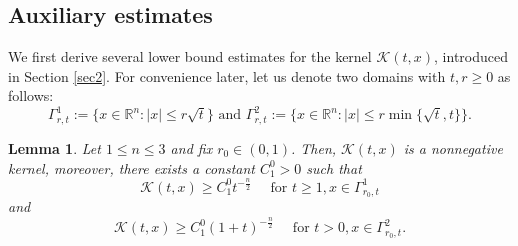 \documentclass[11pt,reqno]{amsart}
\newtheorem{lemma}{Lemma}[section]
\begin{document}
	\subsection{Auxiliary estimates}
	We first derive several lower bound estimates for the kernel $\mathcal{K}(t,x)$, introduced in Section \ref{sec2}. For convenience later, let us denote two domains with $t,r\ge 0$ as follows:
	$$\Gamma^1_{r,t}:= \{x\in\mathbb{R}^n:|x|\leq r\sqrt{t}\} \text{ and }\Gamma^2_{r,t}:= \{x\in\mathbb{R}^n:|x|\leq r\min\{\sqrt{t},t\}\}. $$
	\begin{lemma}\label{es_K}
		Let $1\leq n\leq3$ and fix $r_0\in (0,1)$. Then, $\mathcal{K}(t,x)$ is a nonnegative kernel, moreover, there exists a constant $C^0_1>0$ such that
		\begin{equation}\label{es1_K}
			\mathcal{K}(t,x)\geq C^0_1t^{-\frac{n}{2}} \quad \text{ for }t\geq 1, x\in \Gamma^1_{r_0,t}
		\end{equation}
		and
		\begin{equation}\label{es2_K}
			\mathcal{K}(t,x)\geq C^0_1(1+t)^{-\frac{n}{2}}\quad \text{ for }t>0, x\in \Gamma^2_{r_0,t}.
		\end{equation}
	\end{lemma}
\end{document}
